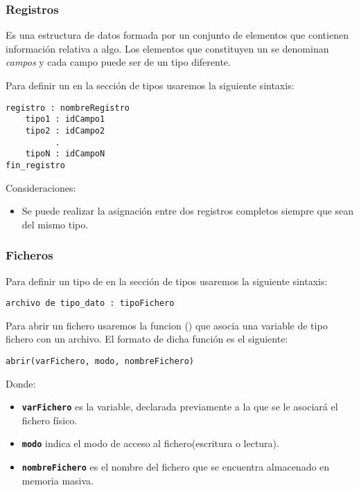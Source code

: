 \documentclass{article}
\begin{document}
\subsubsection{Registros}

Es una estructura de datos formada por un conjunto de elementos que contienen información relativa a algo. Los elementos que constituyen un  se denominan \emph{campos} y cada campo puede ser de un tipo diferente.
\pagebreak

Para definir un  en la sección de tipos usaremos la siguiente sintaxis:

\begin{lstlisting}[language = pseudocodigoesp]
registro : nombreRegistro
    tipo1 : idCampo1
    tipo2 : idCampo2
          .
    tipoN : idCampoN 
fin_registro
\end{lstlisting}

Consideraciones:

\begin{itemize}
\item Se puede realizar la asignación entre dos registros completos siempre que sean del mismo tipo.
\end{itemize}

\subsubsection{Ficheros}

Para definir un tipo de  en la sección de tipos usaremos la siguiente sintaxis:

\begin{lstlisting}[language = pseudocodigoesp]
archivo de tipo_dato : tipoFichero
\end{lstlisting}

Para abrir un fichero usaremos la funcion () que asocia una variable de tipo fichero con un archivo. El formato de dicha función es el siguiente:

\begin{lstlisting}[language = pseudocodigoesp]
abrir(varFichero, modo, nombreFichero)
\end{lstlisting}

Donde:

\begin{itemize}
\item\textbf{\texttt{varFichero}} es la variable, declarada previamente a la que se le asociará el fichero físico.
\item\textbf{\texttt{modo}} indica el modo de acceso al fichero(escritura o lectura).
\item\textbf{\texttt{nombreFichero}} es el nombre del fichero que se encuentra almacenado en memoria masiva.
\end{itemize}
\end{document}
